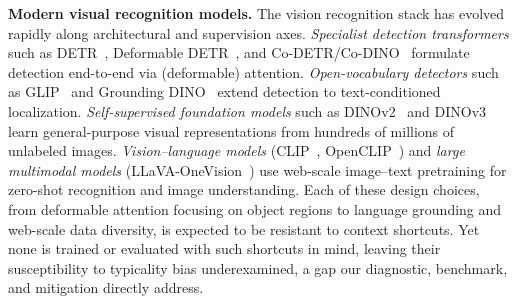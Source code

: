 \noindent\textbf{Modern visual recognition models.} The vision recognition stack has evolved rapidly along architectural and supervision axes. \emph{Specialist detection transformers} such as DETR~\cite{carion2020end}, Deformable DETR~\cite{zhu2021deformable}, and Co-DETR/Co-DINO~\cite{zong2023detrs} formulate detection end-to-end via (deformable) attention. \emph{Open-vocabulary detectors} such as GLIP~\cite{li2022grounded} and Grounding DINO~\cite{liu2024grounding} extend detection to text-conditioned localization. \emph{Self-supervised foundation models} such as DINOv2~\cite{oquab2024dinov} and DINOv3~\cite{simeoni2025dinov3} learn general-purpose visual representations from hundreds of millions of unlabeled images. \emph{Vision--language models} (CLIP~\cite{radford2021learning}, OpenCLIP~\cite{cherti2023reproducible}) and \emph{large multimodal models} (LLaVA-OneVision~\cite{li2024llava}) use web-scale image--text pretraining for zero-shot recognition and image understanding. Each of these design choices, from deformable attention focusing on object regions to language grounding and web-scale data diversity, is expected to be resistant to context shortcuts. Yet none is trained or evaluated with such shortcuts in mind, leaving their susceptibility to typicality bias underexamined, a gap our diagnostic, benchmark, and mitigation directly address.
